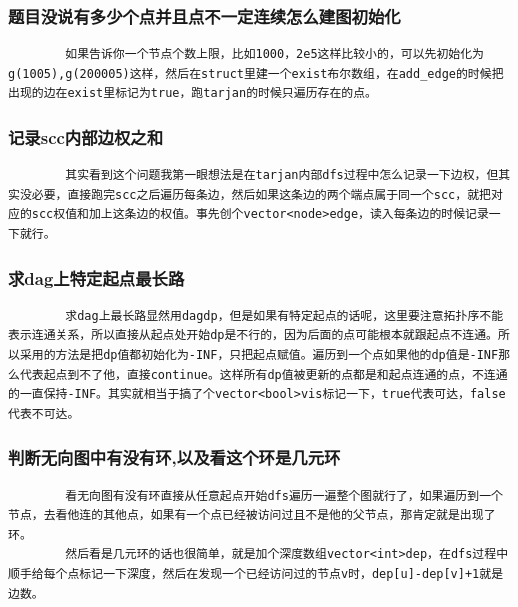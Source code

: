 \documentclass[10pt, a4paper, twocolumn]{article} %
\begin{document}
    \subsubsection{题目没说有多少个点并且点不一定连续怎么建图初始化}
    \begin{lstlisting}
        如果告诉你一个节点个数上限，比如1000，2e5这样比较小的，可以先初始化为g(1005),g(200005)这样，然后在struct里建一个exist布尔数组，在add_edge的时候把出现的边在exist里标记为true，跑tarjan的时候只遍历存在的点。
    \end{lstlisting}
    \subsubsection{记录scc内部边权之和}
    \begin{lstlisting}
        其实看到这个问题我第一眼想法是在tarjan内部dfs过程中怎么记录一下边权，但其实没必要，直接跑完scc之后遍历每条边，然后如果这条边的两个端点属于同一个scc，就把对应的scc权值和加上这条边的权值。事先创个vector<node>edge，读入每条边的时候记录一下就行。
    \end{lstlisting}
    \subsubsection{求dag上特定起点最长路}
    \begin{lstlisting}
        求dag上最长路显然用dagdp，但是如果有特定起点的话呢，这里要注意拓扑序不能表示连通关系，所以直接从起点处开始dp是不行的，因为后面的点可能根本就跟起点不连通。所以采用的方法是把dp值都初始化为-INF，只把起点赋值。遍历到一个点如果他的dp值是-INF那么代表起点到不了他，直接continue。这样所有dp值被更新的点都是和起点连通的点，不连通的一直保持-INF。其实就相当于搞了个vector<bool>vis标记一下，true代表可达，false代表不可达。
    \end{lstlisting}
    \subsubsection{判断无向图中有没有环,以及看这个环是几元环}
    \begin{lstlisting}
        看无向图有没有环直接从任意起点开始dfs遍历一遍整个图就行了，如果遍历到一个节点，去看他连的其他点，如果有一个点已经被访问过且不是他的父节点，那肯定就是出现了环。
        然后看是几元环的话也很简单，就是加个深度数组vector<int>dep，在dfs过程中顺手给每个点标记一下深度，然后在发现一个已经访问过的节点v时，dep[u]-dep[v]+1就是边数。
    \end{lstlisting}
\end{document}
